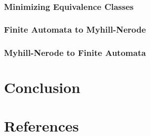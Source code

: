 \documentclass[11pt,a4paper,oneside]{book}
\begin{document}
            \subsection{Minimizing Equivalence Classes}

                \paragraph{}
            
            \subsection{Finite Automata to Myhill-Nerode}

                \paragraph{}

            \subsection{Myhill-Nerode to Finite Automata}

                \paragraph{}


    \chapter{Conclusion}

    \chapter{References}

    {}
    
\end{document}
